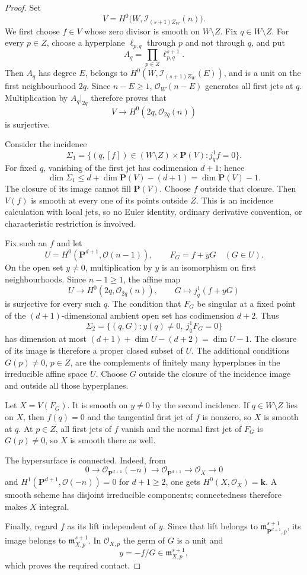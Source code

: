 \documentclass[11pt]{article}
\theoremstyle{definition}
\theoremstyle{remark}
\theoremstyle{plain}
\newcommand{\PP}{\mathbf P}
\newcommand{\kk}{\mathbf k}
\newcommand{\cO}{\mathcal O}
\newcommand{\cI}{\mathcal I}
\begin{document}
\begin{proof}
Set
\[
 V=H^0\bigl(W,\cI_{(s+1)Z_W}(n)\bigr).
\]
We first choose $f\in V$ whose zero divisor is smooth on $W\setminus Z$.
Fix $q\in W\setminus Z$.  For every $p\in Z$, choose a hyperplane
$\ell_{p,q}$ through $p$ and not through $q$, and put
\[
 A_q=\prod_{p\in Z}\ell_{p,q}^{s+1}.
\]
Then $A_q$ has degree $E$, belongs to
$H^0(W,\cI_{(s+1)Z_W}(E))$, and is a unit on the first neighbourhood $2q$.
Since $n-E\geq1$, $\cO_W(n-E)$ generates all first jets at $q$.
Multiplication by $A_q|_{2q}$ therefore proves that
\[
 V\longrightarrow H^0(2q,\cO_{2q}(n))
\]
is surjective.

Consider the incidence
\[
 \Sigma_1=\{(q,[f])\in(W\setminus Z)\times\PP(V):j_q^1f=0\}.
\]
For fixed $q$, vanishing of the first jet has codimension $d+1$; hence
\[
 \dim\Sigma_1\leq d+\dim\PP(V)-(d+1)
 =\dim\PP(V)-1.
\]
The closure of its image cannot fill $\PP(V)$.  Choose $f$ outside that
closure.  Then $V(f)$ is smooth at every one of its points outside $Z$.
This is an incidence calculation with local jets, so no Euler identity,
ordinary derivative convention, or characteristic restriction is involved.

Fix such an $f$ and let
\[
 U=H^0(\PP^{d+1},\cO(n-1)),\qquad F_G=f+yG\quad(G\in U).
\]
On the open set $y\ne0$, multiplication by $y$ is an isomorphism on first
neighbourhoods.  Since $n-1\geq1$, the affine map
\[
 U\longrightarrow H^0(2q,\cO_{2q}(n)),\qquad
 G\longmapsto j_q^1(f+yG)
\]
is surjective for every such $q$.  The condition that $F_G$ be singular at
a fixed point of the $(d+1)$-dimensional ambient open set has codimension
$d+2$.  Thus
\[
 \Sigma_2=\{(q,G):y(q)\ne0,\ j_q^1F_G=0\}
\]
has dimension at most
$(d+1)+\dim U-(d+2)=\dim U-1$.  The closure of its image is therefore a
proper closed subset of $U$.
The additional conditions $G(p)\ne0$, $p\in Z$, are the complements of
finitely many hyperplanes in the irreducible affine space $U$.  Choose $G$
outside the closure of the incidence image and outside all those hyperplanes.

Let $X=V(F_G)$.  It is smooth on $y\ne0$ by the second incidence.  If
$q\in W\setminus Z$ lies on $X$, then $f(q)=0$ and the tangential first jet
of $f$ is nonzero, so $X$ is smooth at $q$.  At $p\in Z$, all first jets of
$f$ vanish and the normal first jet of $F_G$ is $G(p)\ne0$, so $X$ is
smooth there as well.

The hypersurface is connected.  Indeed, from
\[
 0\longrightarrow\cO_{\PP^{d+1}}(-n)
 \longrightarrow\cO_{\PP^{d+1}}
 \longrightarrow\cO_X\longrightarrow0
\]
and $H^1(\PP^{d+1},\cO(-n))=0$ for $d+1\geq2$, one gets
$H^0(X,\cO_X)=\kk$.  A smooth scheme has disjoint irreducible components;
connectedness therefore makes $X$ integral.

Finally, regard $f$ as its lift independent of $y$.  Since that lift belongs
to $\mathfrak m_{\PP^{d+1},p}^{s+1}$, its image belongs to
$\mathfrak m_{X,p}^{s+1}$.  In $\cO_{X,p}$ the germ of $G$ is a unit and
\[
 y=-f/G\in\mathfrak m_{X,p}^{s+1},
\]
which proves the required contact.
\end{proof}
\end{document}
